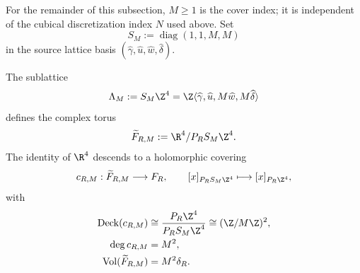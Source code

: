For the remainder of this subsection, \(M\ge1\) is the cover index; it is
independent of the cubical discretization index \(N\) used above.  Set
\begin{equation}\label{eq:s6cusp-cover-scaling-matrix}
 S_M:=\operatorname{diag}(1,1,M,M)
\end{equation}
in the source lattice basis
\((\widehat\gamma,\widehat u,\widehat w,\widehat\delta)\).

\begin{theorem}
\label{thm:s6cusp-monodromy-compatible-cover}
The sublattice
\begin{equation}\label{eq:s6cusp-cover-sublattice}
 \Lambda_M:=S_M\Z^4
 =\Z\langle
 \widehat\gamma,\widehat u,
 M\widehat w,M\widehat\delta\rangle
\end{equation}
defines the complex torus
\begin{equation}\label{eq:s6cusp-covered-fibre}
 \widetilde F_{R,M}:=
 \R^4/P_RS_M\Z^4.
\end{equation}
The identity of \(\R^4\) descends to a holomorphic covering
\begin{equation}\label{eq:s6cusp-finite-cover-map}
 c_{R,M}:\widetilde F_{R,M}\longrightarrow F_R,
 \qquad
 [x]_{P_RS_M\Z^4}\longmapsto[x]_{P_R\Z^4},
\end{equation}
with
\begin{align}
 \operatorname{Deck}(c_{R,M})
 &\cong
 \frac{P_R\Z^4}{P_RS_M\Z^4}
 \cong(\Z/M\Z)^2,
 \label{eq:s6cusp-cover-deck-group}\\
 \deg c_{R,M}&=M^2,\label{eq:s6cusp-cover-degree}\\
 \operatorname{Vol}(\widetilde F_{R,M})
 &=M^2\delta_R.
 \label{eq:s6cusp-cover-volume}
\end{align}


\end{theorem}
